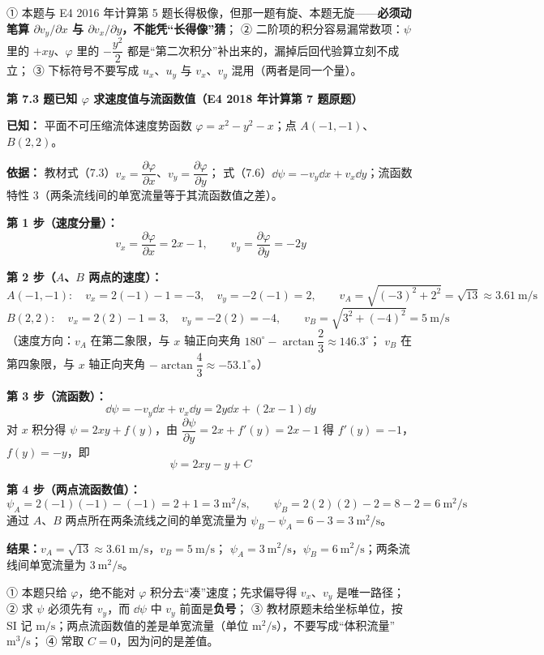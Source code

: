 \begin{yicuo}
① 本题与 E4 2016 年计算第 5 题长得极像，但那一题有旋、本题无旋——\textbf{必须动笔算 $\partial v_y/\partial x$ 与 $\partial v_x/\partial y$，不能凭“长得像”猜}；
② 二阶项的积分容易漏常数项：$\psi$ 里的 $+xy$、$\varphi$ 里的 $-\dfrac{y^2}{2}$ 都是“第二次积分”补出来的，漏掉后回代验算立刻不成立；
③ 下标符号不要写成 $u_x$、$u_y$ 与 $v_x$、$v_y$ 混用（两者是同一个量）。
\end{yicuo}

\noindent\textbf{第 7.3 题\quad 已知 $\varphi$ 求速度值与流函数值（E4 2018 年计算第 7 题原题）}

\begin{jie}
\textbf{已知：} 平面不可压缩流体速度势函数 $\varphi=x^2-y^2-x$；点 $A(-1,-1)$、$B(2,2)$。

\textbf{依据：} 教材式（7.3）$v_x=\dfrac{\partial\varphi}{\partial x}$、$v_y=\dfrac{\partial\varphi}{\partial y}$；
式（7.6）$\dd\psi=-v_y\dd x+v_x\dd y$；流函数特性 3（两条流线间的单宽流量等于其流函数值之差）。

\textbf{第 1 步（速度分量）：}
\[
v_x=\frac{\partial\varphi}{\partial x}=2x-1,\qquad v_y=\frac{\partial\varphi}{\partial y}=-2y
\]

\textbf{第 2 步（$A$、$B$ 两点的速度）：}
\[
A(-1,-1):\quad v_x=2(-1)-1=-3,\quad v_y=-2(-1)=2,\qquad
v_A=\sqrt{(-3)^2+2^2}=\sqrt{13}\approx 3.61\ \mathrm{m/s}
\]
\[
B(2,2):\quad v_x=2(2)-1=3,\quad v_y=-2(2)=-4,\qquad
v_B=\sqrt{3^2+(-4)^2}=5\ \mathrm{m/s}
\]
（速度方向：$v_A$ 在第二象限，与 $x$ 轴正向夹角 $180^\circ-\arctan\dfrac{2}{3}\approx 146.3^\circ$；
$v_B$ 在第四象限，与 $x$ 轴正向夹角 $-\arctan\dfrac{4}{3}\approx -53.1^\circ$。）

\textbf{第 3 步（流函数）：}
\[
\dd\psi=-v_y\dd x+v_x\dd y=2y\dd x+(2x-1)\dd y
\]
对 $x$ 积分得 $\psi=2xy+f(y)$，由 $\dfrac{\partial\psi}{\partial y}=2x+f'(y)=2x-1$ 得 $f'(y)=-1$，$f(y)=-y$，即
\[
\psi=2xy-y+C
\]

\textbf{第 4 步（两点流函数值）：}
\[
\psi_A=2(-1)(-1)-(-1)=2+1=3\ \mathrm{m^2/s},\qquad
\psi_B=2(2)(2)-2=8-2=6\ \mathrm{m^2/s}
\]
通过 $A$、$B$ 两点所在两条流线之间的单宽流量为 $\psi_B-\psi_A=6-3=3\ \mathrm{m^2/s}$。

\textbf{结果：}$v_A=\sqrt{13}\approx 3.61\ \mathrm{m/s}$，$v_B=5\ \mathrm{m/s}$；
$\psi_A=3\ \mathrm{m^2/s}$，$\psi_B=6\ \mathrm{m^2/s}$；两条流线间单宽流量为 $3\ \mathrm{m^2/s}$。
\end{jie}

\begin{yicuo}
① 本题只给 $\varphi$，绝不能对 $\varphi$ 积分去“凑”速度；先求偏导得 $v_x$、$v_y$ 是唯一路径；
② 求 $\psi$ 必须先有 $v_y$，而 $\dd\psi$ 中 $v_y$ 前面是\textbf{负号}；
③ 教材原题未给坐标单位，按 SI 记 $\mathrm{m/s}$；两点流函数值的差是单宽流量（单位 $\mathrm{m^2/s}$），不要写成“体积流量”$\mathrm{m^3/s}$；
④ 常取 $C=0$，因为问的是差值。
\end{yicuo}

